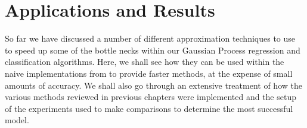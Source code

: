 \section{Applications and Results}\label{Chapter5}

So far we have discussed a number of different approximation techniques to use to speed up some of the bottle necks within our Gaussian Process regression and classification algorithms. Here, we shall see how they can be used within the naive implementations from  to provide faster methods, at the expense of small amounts of accuracy. We shall also go through an extensive treatment of how the various methods reviewed in previous chapters were implemented and the setup of the experiments used to make comparisons to determine the most successful model.





